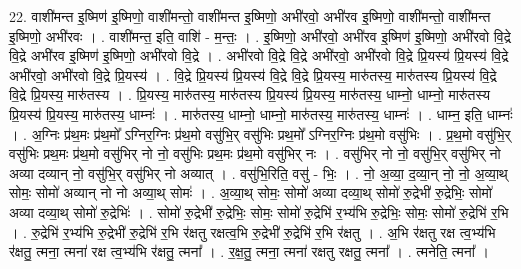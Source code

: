 \documentclass[17pt]{extarticle}
\begin{document}
22. वाशी॑मन्त इ॒ष्मिण॑ इ॒ष्मिणो॒ वाशी॑मन्तो॒ वाशी॑मन्त इ॒ष्मिणो॒ अभी॑रवो॒ अभी॑रव इ॒ष्मिणो॒ वाशी॑मन्तो॒ वाशी॑मन्त इ॒ष्मिणो॒ अभी॑रवः । . वाशी॑मन्त॒ इति॒ वाशि॑ - म॒न्तः॒ । . इ॒ष्मिणो॒ अभी॑रवो॒ अभी॑रव इ॒ष्मिण॑ इ॒ष्मिणो॒ अभी॑रवो वि॒द्रे वि॒द्रे अभी॑रव इ॒ष्मिण॑ इ॒ष्मिणो॒ अभी॑रवो वि॒द्रे । . अभी॑रवो वि॒द्रे वि॒द्रे अभी॑रवो॒ अभी॑रवो वि॒द्रे प्रि॒यस्य॑ प्रि॒यस्य॑ वि॒द्रे अभी॑रवो॒ अभी॑रवो वि॒द्रे प्रि॒यस्य॑ । . वि॒द्रे प्रि॒यस्य॑ प्रि॒यस्य॑ वि॒द्रे वि॒द्रे प्रि॒यस्य॒ मारु॑तस्य॒ मारु॑तस्य प्रि॒यस्य॑ वि॒द्रे वि॒द्रे प्रि॒यस्य॒ मारु॑तस्य । . प्रि॒यस्य॒ मारु॑तस्य॒ मारु॑तस्य प्रि॒यस्य॑ प्रि॒यस्य॒ मारु॑तस्य॒ धाम्नो॒ धाम्नो॒ मारु॑तस्य प्रि॒यस्य॑ प्रि॒यस्य॒ मारु॑तस्य॒ धाम्नः॑ । . मारु॑तस्य॒ धाम्नो॒ धाम्नो॒ मारु॑तस्य॒ मारु॑तस्य॒ धाम्नः॑ । . धाम्न॒ इति॒ धाम्नः॑ । . अ॒ग्निः प्र॑थ॒मः प्र॑थ॒मो᳚ ऽग्निर॒ग्निः प्र॑थ॒मो वसु॑भि॒र् वसु॑भिः प्रथ॒मो᳚ ऽग्निर॒ग्निः प्र॑थ॒मो वसु॑भिः । . प्र॒थ॒मो वसु॑भि॒र् वसु॑भिः प्रथ॒मः प्र॑थ॒मो वसु॑भिर् नो नो॒ वसु॑भिः प्रथ॒मः प्र॑थ॒मो वसु॑भिर् नः । . वसु॑भिर् नो नो॒ वसु॑भि॒र् वसु॑भिर् नो अव्या दव्यान् नो॒ वसु॑भि॒र् वसु॑भिर् नो अव्यात् । . वसु॑भि॒रिति॒ वसु॑ - भिः॒ । . नो॒ अ॒व्या॒ द॒व्या॒न् नो॒ नो॒ अ॒व्या॒थ् सोमः॒ सोमो॑ अव्यान् नो नो अव्या॒थ् सोमः॑ । . अ॒व्या॒थ् सोमः॒ सोमो॑ अव्या दव्या॒थ् सोमो॑ रु॒द्रेभी॑ रु॒द्रेभिः॒ सोमो॑ अव्या दव्या॒थ् सोमो॑ रु॒द्रेभिः॑ । . सोमो॑ रु॒द्रेभी॑ रु॒द्रेभिः॒ सोमः॒ सोमो॑ रु॒द्रेभि॑ र॒भ्य॑भि रु॒द्रेभिः॒ सोमः॒ सोमो॑ रु॒द्रेभि॑ र॒भि । . रु॒द्रेभि॑ र॒भ्य॑भि रु॒द्रेभी॑ रु॒द्रेभि॑ र॒भि र॑क्षतु रक्षत्व॒भि रु॒द्रेभी॑ रु॒द्रेभि॑ र॒भि र॑क्षतु । . अ॒भि र॑क्षतु रक्ष त्व॒भ्य॑भि र॑क्षतु॒ त्मना॒ त्मना॑ रक्ष त्व॒भ्य॑भि र॑क्षतु॒ त्मना᳚ । . र॒क्ष॒तु॒ त्मना॒ त्मना॑ रक्षतु रक्षतु॒ त्मना᳚ । . त्मनेति॒ त्मना᳚ । \newline
\end{document}
